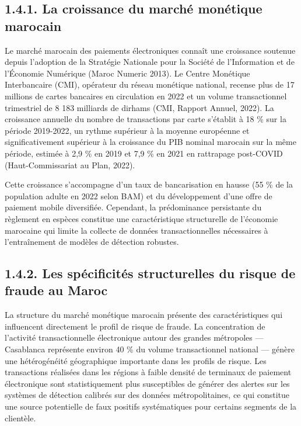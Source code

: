 \subsection{1.4.1. La croissance du marché monétique marocain}

Le marché marocain des paiements électroniques connaît une croissance soutenue depuis l'adoption de la Stratégie Nationale pour la Société de l'Information et de l'Économie Numérique (Maroc Numeric 2013). Le Centre Monétique Interbancaire (CMI), opérateur du réseau monétique national, recense plus de 17 millions de cartes bancaires en circulation en 2022 et un volume transactionnel trimestriel de 8 183 milliards de dirhams (CMI, Rapport Annuel, 2022). La croissance annuelle du nombre de transactions par carte s'établit à 18 \% sur la période 2019-2022, un rythme supérieur à la moyenne européenne et significativement supérieur à la croissance du PIB nominal marocain sur la même période, estimée à 2,9 \% en 2019 et 7,9 \% en 2021 en rattrapage post-COVID (Haut-Commissariat au Plan, 2022).

Cette croissance s'accompagne d'un taux de bancarisation en hausse (55 \% de la population adulte en 2022 selon BAM) et du développement d'une offre de paiement mobile diversifiée. Cependant, la prédominance persistante du règlement en espèces constitue une caractéristique structurelle de l'économie marocaine qui limite la collecte de données transactionnelles nécessaires à l'entraînement de modèles de détection robustes.

\subsection{1.4.2. Les spécificités structurelles du risque de fraude au Maroc}

La structure du marché monétique marocain présente des caractéristiques qui influencent directement le profil de risque de fraude. La concentration de l'activité transactionnelle électronique autour des grandes métropoles — Casablanca représente environ 40 \% du volume transactionnel national — génère une hétérogénéité géographique importante dans les profils de risque. Les transactions réalisées dans les régions à faible densité de terminaux de paiement électronique sont statistiquement plus susceptibles de générer des alertes sur les systèmes de détection calibrés sur des données métropolitaines, ce qui constitue une source potentielle de faux positifs systématiques pour certains segments de la clientèle.

